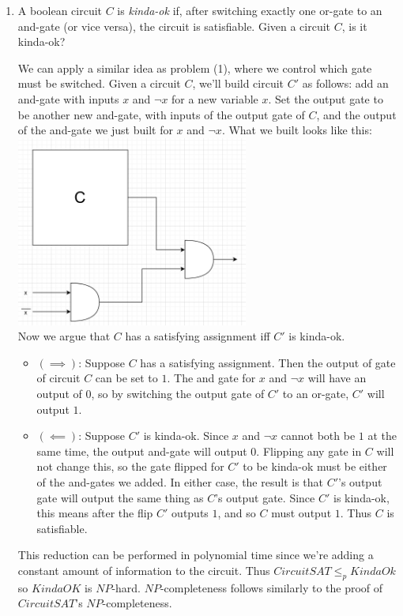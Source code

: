 \documentclass[fleqn]{article}
\begin{document}
\begin{enumerate}
    \item A boolean circuit $C$ is \textit{kinda-ok} if, after switching exactly one or-gate to an and-gate (or vice versa), the circuit is satisfiable. Given a circuit $C$, is it kinda-ok?
    \begin{answer}
        We can apply a similar idea as problem (1), where we control which gate must be switched. Given a circuit $C$, we'll build circuit $C'$ as follows: add an and-gate with inputs $x$ and $\neg x$ for a new variable $x$. Set the output gate to be another new and-gate, with inputs of the output gate of $C$, and the output of the and-gate we just built for $x$ and $\neg x$. What we built looks like this:
        \includegraphics[width=3in]{figures/circuit.png}\\
        Now we argue that $C$ has a satisfying assignment iff $C'$ is kinda-ok.
        \begin{itemize}
            \item $(\implies)$: Suppose $C$ has a satisfying assignment. Then the output of gate of circuit $C$ can be set to $1$. The and gate for $x$ and $\neg x$ will have an output of $0$, so by switching the output gate of $C'$ to an or-gate, $C'$ will output $1$.
            \item $(\impliedby)$: Suppose $C'$ is kinda-ok. Since $x$ and $\neg x$ cannot both be $1$ at the same time, the output and-gate will output $0$. Flipping any gate in $C$ will not change this, so the gate flipped for $C'$ to be kinda-ok must be either of the and-gates we added. In either case, the result is that $C'$'s output gate will output the same thing as $C$'s output gate. Since $C'$ is kinda-ok, this means after the flip $C'$ outputs $1$, and so $C$ must output $1$. Thus $C$ is satisfiable.
        \end{itemize}
        This reduction can be performed in polynomial time since we're adding a constant amount of information to the circuit. Thus $CircuitSAT \leq_p KindaOk$ so $KindaOK$ is $NP$-hard. $NP$-completeness follows similarly to the proof of $CircuitSAT$'s $NP$-completeness.

\end{answer}
\end{enumerate}
\end{document}
